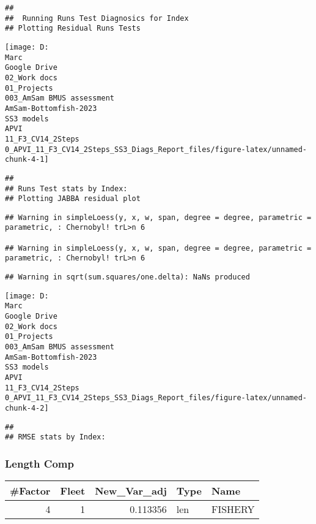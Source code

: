 \documentclass[
]{article}
\begin{document}
\begin{verbatim}
## 
##  Running Runs Test Diagnosics for Index 
## Plotting Residual Runs Tests
\end{verbatim}

\begin{center}\texttt{[image: D:\\Marc\\Google Drive\\02\_Work docs\\01\_Projects\\003\_AmSam BMUS assessment\\AmSam-Bottomfish-2023\\SS3 models\\APVI\\11\_F3\_CV14\_2Steps\\0\_APVI\_11\_F3\_CV14\_2Steps\_SS3\_Diags\_Report\_files/figure-latex/unnamed-chunk-4-1]} \end{center}

\begin{verbatim}
## 
## Runs Test stats by Index:
## Plotting JABBA residual plot
\end{verbatim}

\begin{verbatim}
## Warning in simpleLoess(y, x, w, span, degree = degree, parametric = parametric, : Chernobyl! trL>n 6

## Warning in simpleLoess(y, x, w, span, degree = degree, parametric = parametric, : Chernobyl! trL>n 6
\end{verbatim}

\begin{verbatim}
## Warning in sqrt(sum.squares/one.delta): NaNs produced
\end{verbatim}

\begin{center}\texttt{[image: D:\\Marc\\Google Drive\\02\_Work docs\\01\_Projects\\003\_AmSam BMUS assessment\\AmSam-Bottomfish-2023\\SS3 models\\APVI\\11\_F3\_CV14\_2Steps\\0\_APVI\_11\_F3\_CV14\_2Steps\_SS3\_Diags\_Report\_files/figure-latex/unnamed-chunk-4-2]} \end{center}

\begin{verbatim}
## 
## RMSE stats by Index:
\end{verbatim}

\hypertarget{length-comp}{%
\subsubsection{Length Comp}\label{length-comp}}

\captionsetup[table]{labelformat=empty,skip=1pt}
\begin{longtable}{rrrll}
\toprule
\#Factor & Fleet & New\_Var\_adj & Type & Name \\ 
\midrule
4 & 1 & 0.113356 & len & FISHERY \\ 
\bottomrule
\end{longtable}
\end{document}
